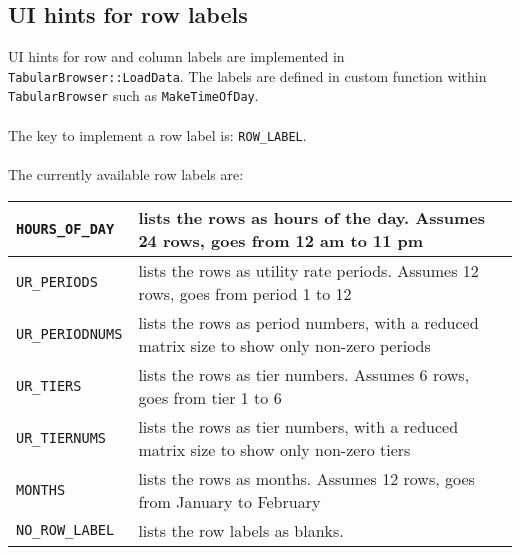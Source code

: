 \documentclass[11pt]{article} %
\begin{document}
\subsection{UI hints for row labels}
UI hints for row and column labels are implemented in \texttt{TabularBrowser::LoadData}.  The labels are defined in custom function within \texttt{TabularBrowser} such as \texttt{MakeTimeOfDay}.  \\
\\
The key to implement a row label is: \texttt{ROW\_LABEL}.\\
\\
The currently available row labels are: \\
\begin{tabular}{l | p{13cm}}
\hline
\texttt{HOURS\_OF\_DAY} &  lists the rows as hours of the day.  Assumes 24 rows, goes from 12 am to 11 pm \\ \hline
\texttt{UR\_PERIODS} & lists the rows as utility rate periods.  Assumes 12 rows, goes from period 1 to 12 \\ \hline
\texttt{UR\_PERIODNUMS} & lists the rows as period numbers, with a reduced matrix size to show only non-zero periods \\ \hline
\texttt{UR\_TIERS} & lists the rows as tier numbers.  Assumes 6 rows, goes from tier 1 to 6 \\ \hline
\texttt{UR\_TIERNUMS} & lists the rows as tier numbers, with a reduced matrix size to show only non-zero tiers \\ \hline
\texttt{MONTHS} & lists the rows as months.  Assumes 12 rows, goes from January to February \\ \hline
\texttt{NO\_ROW\_LABEL} & lists the row labels as blanks. \\ \hline
\end{tabular}
\end{document}
